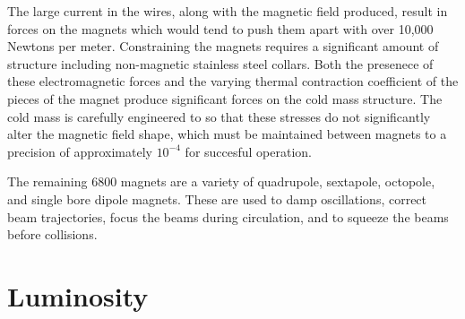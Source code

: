 The large current in the wires, along with the magnetic field produced, result in forces on the magnets which would tend to push them apart with over 10,000 Newtons per meter.
Constraining the magnets requires a significant amount of structure including non-magnetic stainless steel collars. 
Both the presenece of these electromagnetic forces and the varying thermal contraction coefficient of the pieces of the magnet produce significant forces on the cold mass structure. 
The cold mass is carefully engineered to so that these stresses do not significantly alter the magnetic field shape, which must be maintained between magnets to a precision of approximately $10^{-4}$ for succesful operation.

The remaining 6800 magnets are a variety of quadrupole, sextapole, octopole, and single bore dipole magnets.
These are used to damp oscillations, correct beam trajectories, focus the beams during circulation, and to squeeze the beams before collisions.





\section{Luminosity}

